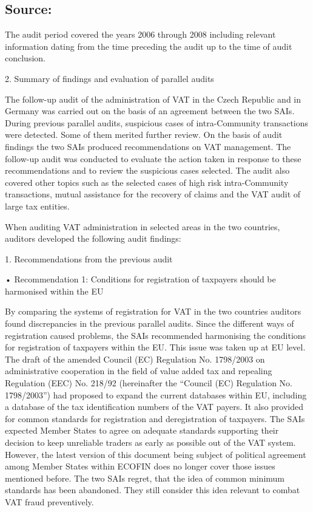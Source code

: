 \documentclass[10pt]{article}
\begin{document}
\subsection*{Source:}

The audit period covered the years 2006 through 2008 including relevant information dating from the time preceding the audit up to the time of audit conclusion.


2. Summary of findings and evaluation of parallel audits

The follow-up audit of the administration of VAT in the Czech Republic and in Germany was carried out on the basis of an agreement between the two SAIs.
During previous parallel audits, suspicious cases of intra-Community transactions were detected.
Some of them merited further review.
On the basis of audit findings the two SAIs produced recommendations on VAT management.
The follow-up audit was conducted to evaluate the action taken in response to these recommendations and to review the suspicious cases selected.
The audit also covered other topics such as the selected cases of high risk intra-Community transactions, mutual assistance for the recovery of claims and the VAT audit of large tax entities.


When auditing VAT administration in selected areas in the two countries, auditors developed the following audit findings:



1. Recommendations from the previous audit



• Recommendation 1: Conditions for registration of taxpayers should be harmonised within the EU

By comparing the systems of registration for VAT in the two countries auditors found discrepancies in the previous parallel audits.
Since the different ways of registration caused problems, the SAIs recommended harmonising the conditions for registration of taxpayers within the EU.
This issue was taken up at EU level.
The draft of the amended Council (EC) Regulation No. 1798/2003 on administrative cooperation in the field of value added tax and repealing Regulation (EEC) No. 218/92 (hereinafter the “Council (EC) Regulation No. 1798/2003”) had proposed to expand the current databases within EU, including a database of the tax identification numbers of the VAT payers.
It also provided for common standards for registration and deregistration of taxpayers.
The SAIs expected Member States to agree on adequate standards supporting their decision to keep unreliable traders as early as possible out of the VAT system.
However, the latest version of this document being subject of political agreement among Member States within ECOFIN does no longer cover those issues mentioned before.
The two SAIs regret, that the idea of common minimum standards has been abandoned.
They still consider this idea relevant to combat VAT fraud preventively.
\end{document}
